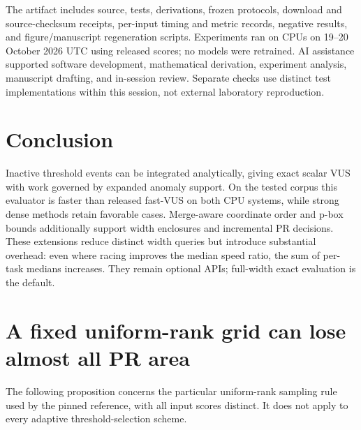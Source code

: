 The artifact includes source, tests, derivations, frozen protocols, download
and source-checksum receipts, per-input timing and metric records, negative
results, and figure/manuscript regeneration scripts. Experiments ran on CPUs on
19--20 October 2026 UTC using released scores; no models were retrained.
AI assistance supported software development, mathematical derivation,
experiment analysis, manuscript drafting, and in-session review.
Separate checks use distinct test implementations within this session,
not external laboratory reproduction.

\section{Conclusion}
Inactive threshold events can be integrated analytically, giving exact
scalar VUS with work governed by expanded anomaly support. On the tested
corpus this evaluator is faster than released fast-VUS on both CPU systems,
while strong dense methods retain favorable cases. Merge-aware coordinate
order and p-box bounds additionally support width enclosures and incremental
PR decisions. These extensions reduce distinct width queries but introduce
substantial overhead: even where racing improves the median speed ratio,
the sum of per-task medians increases. They remain optional APIs; full-width
exact evaluation is the default.

\appendix
\section{A fixed uniform-rank grid can lose almost all PR area}
\label{app:grid}
The following proposition concerns the particular uniform-rank sampling rule
used by the pinned reference, with all input scores distinct. It does not
apply to every adaptive threshold-selection scheme.


